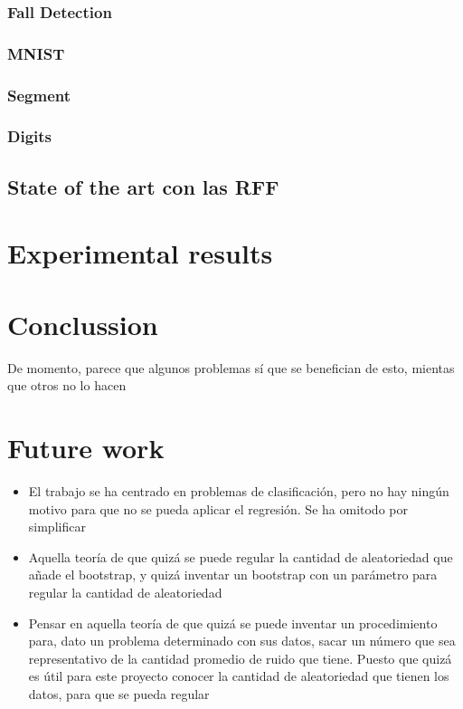 \documentclass{article}
\begin{document}
\subsubsection{Fall Detection}
\subsubsection{MNIST}
\subsubsection{Segment}
\subsubsection{Digits}






%

\subsection{State of the art con las RFF}



\section{Experimental results}
\section{Conclussion}
De momento, parece que algunos problemas sí que se benefician de esto, mientas
que otros no lo hacen

\section{Future work}
\begin{itemize}
 \item El trabajo se ha centrado en problemas de clasificación, pero no hay
       ningún motivo para que no se pueda aplicar el regresión. Se ha omitodo por
       simplificar
 \item Aquella teoría de que quizá se puede regular la cantidad de aleatoriedad
       que añade el bootstrap, y quizá inventar un bootstrap con un parámetro para
       regular la cantidad de aleatoriedad
 \item Pensar en aquella teoría de que quizá se puede inventar un procedimiento
       para, dato un problema determinado con sus datos, sacar un número que sea
       representativo de la cantidad promedio de ruido que tiene. Puesto que quizá
       es útil para este proyecto conocer la cantidad de aleatoriedad que tienen
       los datos, para que se pueda regular
\end{itemize}
\end{document}
